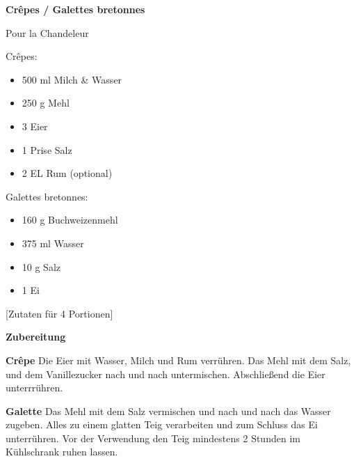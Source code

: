 

\parindent0pt	

\pagestyle{empty}


\textbf{{\LARGE Crêpes / Galettes bretonnes}}%

\hrulefill



Pour la Chandeleur
\vspace{0,5 cm}
\vspace*{\fill}
\begin{multicols}{2}	

Crêpes:
\begin{itemize}
\item 500 ml Milch \& Wasser
\item 250 g Mehl
\item 3 Eier
\item 1 Prise Salz
\item 2 EL Rum (optional)
\end{itemize}
Galettes bretonnes:
\begin{itemize}
\item 160 g Buchweizenmehl
\item 375 ml Wasser
\item 10 g Salz
\item 1 Ei
\end{itemize}
\end{multicols}
\vfill									%

\vspace{1cm}
%
\begin{center}
%
[Zutaten für 4 Portionen]%
\end{center}


\vfill
\newpage
\textbf{{\LARGE Zubereitung}}%

\hrulefill

\vspace*{\fill}
\begin{multicols}{2}


\textbf{Crêpe}\newline
Die Eier mit Wasser, Milch und Rum verrühren. 
Das Mehl mit dem Salz, und dem Vanillezucker nach und nach untermischen.
Abschließend die  Eier unterrrühren.\newline
\newline



\textbf{Galette} \newline
Das Mehl mit dem Salz vermischen und nach und nach das Wasser zugeben.
Alles zu einem glatten Teig verarbeiten und zum Schluss das Ei unterrühren. 
Vor der Verwendung den Teig mindestens 2 Stunden im Kühlschrank ruhen lassen.\newline


\end{multicols}
\vfill
